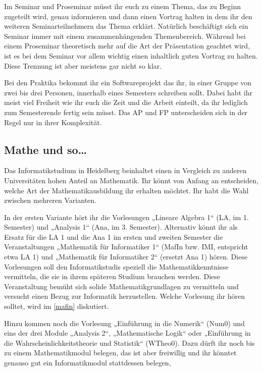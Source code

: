 Im Seminar und Proseminar müsst ihr euch zu einem Thema, das zu Beginn zugeteilt wird, genau informieren und dann einen Vortrag halten in dem ihr den weiteren Seminarteilnehmern das Thema erklärt. Natürlich beschäftigt sich ein Seminar immer mit einem zusammenhängenden Themenbereich. Während bei einem Proseminar theoretisch mehr auf die Art der Präsentation geachtet wird, ist es bei dem Seminar vor allem wichtig einen inhaltlich guten Vortrag zu halten. Diese Trennung ist aber meistens gar nicht so klar.

Bei den Praktika bekommt ihr ein Softwareprojekt das ihr, in einer Gruppe von zwei bis drei Personen, innerhalb eines Semesters schreiben sollt. Dabei habt ihr meist viel Freiheit wie ihr euch die Zeit und die Arbeit einteilt, da ihr lediglich zum Semesterende fertig sein müsst. Das AP und FP unterscheiden sich in der Regel nur in ihrer Komplexität.

\subsection{Mathe und so\dots}

Das Informatikstudium in Heidelberg beinhaltet einen in Vergleich zu anderen Universitäten hohen Anteil an Mathematik. Ihr könnt von Anfang an entscheiden, welche Art der Mathematikausbildung ihr erhalten möchtet. Ihr habt die Wahl zwischen mehreren Varianten.

In der ersten Variante hört ihr die Vorlesungen „Lineare Algebra 1“ (\gls{LA}, im 1. Semester) und „Analysis 1“ (\gls{Ana}, im 3. Semester). Alternativ könnt ihr als Ersatz für die LA 1 und die Ana 1 im ersten und zweiten Semester die Veranstaltungen „Mathematik für Informatiker 1“ (\gls{MafIn} bzw. IMI, entspricht etwa LA 1) und „Mathematik für Informatiker 2“ (ersetzt Ana 1) hören. Diese Vorlesungen soll den Informatikstudis speziell die Mathematikkenntnisse vermitteln, die sie in ihrem späteren Studium brauchen werden. Diese Veranstaltung bemüht sich solide Mathematikgrundlagen zu vermitteln und versucht einen Bezug zur Informatik herzustellen. Welche Vorlesung ihr hören solltet, wird im \autoref{mafin} diskutiert.

Hinzu kommen noch die Vorlesung „Einführung in die Numerik“ (\gls{Num0}) und eins der drei Module „Analysis 2“, „Mathematische Logik“ oder „Einführung in die Wahrscheinlichkeitstheorie und Statistik“ (\gls{WTheo0}). Dazu dürft ihr noch bis zu einem Mathematikmodul belegen, das ist aber freiwillig und ihr könntet genauso gut ein Informatikmodul stattdessen belegen,

